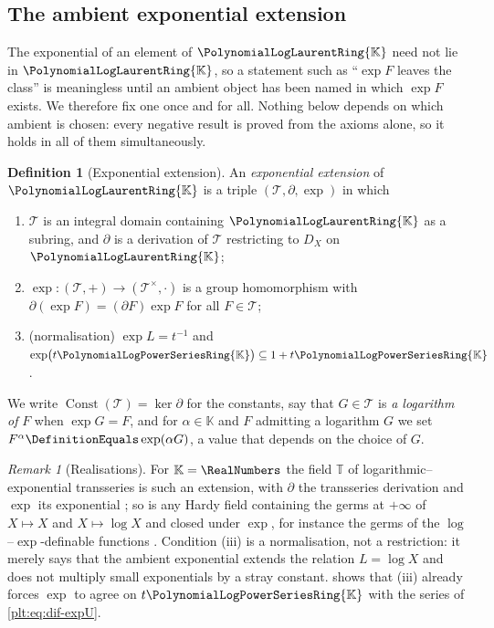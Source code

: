 \documentclass[11pt,oneside]{article}
\theoremstyle{plain}
\theoremstyle{definition}
\newtheorem{definition}[theorem]{Definition}
\theoremstyle{remark}
\newtheorem{remark}[theorem]{Remark}
\newcommand{\K}{\mathbb{K}}
\newcommand{\PLpow}{\PolynomialLogPowerSeriesRing{\K}}   %
\newcommand{\PLlau}{\PolynomialLogLaurentRing{\K}}       %
\newcommand{\DX}{D_{X}}                                  %
\begin{document}
\subsection{The ambient exponential extension}
\label{plt:sec:dif-ambient}

The exponential of an element of \(\PLlau\) need not lie in \(\PLlau\), so a
statement such as ``\(\exp F\) leaves the class'' is meaningless until an
ambient object has been named in which \(\exp F\) exists.  We therefore fix one
once and for all.  Nothing below depends on which ambient is chosen: every
negative result is proved from the axioms alone, so it holds in all of them
simultaneously.

\begin{definition}[Exponential extension]\label{plt:def:dif-exp-extension}
An \emph{exponential extension} of \(\PLlau\) is a triple
\((\mathcal T,\partial,\exp)\) in which
\begin{enumerate}
\item \(\mathcal T\) is an integral domain containing \(\PLlau\) as a subring,
      and \(\partial\) is a derivation of \(\mathcal T\) restricting to
      \(\DX\) on \(\PLlau\);
\item \(\exp\colon(\mathcal T,+)\to(\mathcal T^{\times},\cdot)\) is a group
      homomorphism with \(\partial(\exp F)=(\partial F)\exp F\) for all
      \(F\in\mathcal T\);
\item (normalisation) \(\exp L=t^{-1}\) and \(\exp\bigl(t\PLpow\bigr)
      \subseteq1+t\PLpow\).
\end{enumerate}
We write \(\operatorname{Const}(\mathcal T)=\ker\partial\) for the constants,
say that \(G\in\mathcal T\) is \emph{a logarithm of} \(F\) when \(\exp G=F\),
and for \(\alpha\in\K\) and \(F\) admitting a logarithm \(G\) we set
\(F^{\alpha}\DefinitionEquals\exp(\alpha G)\), a value that depends on the
choice of \(G\).
\end{definition}

\begin{remark}[Realisations]\label{plt:rmk:dif-realisations}
For \(\K=\RealNumbers\) the field \(\mathbb{T}\) of logarithmic--exponential
transseries is such an extension, with \(\partial\) the transseries derivation
and \(\exp\) its exponential
\cite{adh-book,vanderhoeven-book,edgar-beginners}; so is any Hardy field
containing the germs at \(+\infty\) of \(X\mapsto X\) and \(X\mapsto\log X\)
and closed under \(\exp\), for instance the germs of the
\(\log\)--\(\exp\)-definable functions \cite{vdDMM-2001,hardy-orders}.
Condition (iii) is a normalisation, not a restriction: it merely says that the
ambient exponential extends the relation \(L=\log X\) and does not multiply
small exponentials by a stray constant.   shows
that (iii) already forces \(\exp\) to agree on \(t\PLpow\) with the series of
\cref{plt:eq:dif-expU}.
\end{remark}
\end{document}
